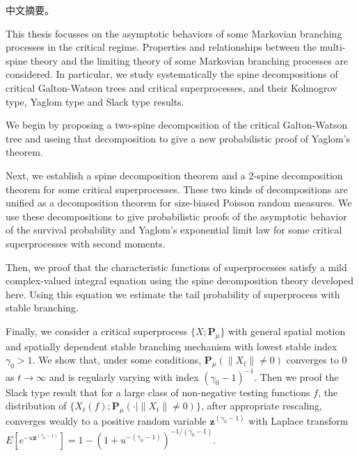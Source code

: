 
\begin{cabstract}
	中文摘要。
\end{cabstract}

\begin{eabstract}
	This thesis focusses on the asymptotic behaviors of some Markovian branching processes in the critical regime.
	Properties and relationships between the multi-spine theory and the limiting theory of some Markovian branching processes are considered.
	In particular, we study systematically the spine decompositions of critical Galton-Watson trees and critical superprocesses, and their Kolmogrov type, Yaglom type and Slack type results. 

	We begin by proposing a two-spine decomposition of the critical Galton-Watson tree and useing that decomposition to give a new probabilistic proof of Yaglom’s theorem.
	
	Next, we establish a spine decomposition theorem and a 2-spine decomposition theorem for some critical superprocesses. These two kinds of decompositions are unified as a decomposition theorem for size-biased Poisson random measures. We use these decompositions to give probabilistic proofs of the asymptotic behavior of the survival probability and Yaglom’s exponential limit law for some critical superprocesses with second moments.

	Then, we proof that the characteristic functions of superprocesses satisfy a mild complex-valued integral equation using the spine decomposition theory developed here. Using this equation we estimate the tail probability of superprocess with stable branching.

	Finally, we consider a critical superprocess $\{X;\mathbf P_\mu\}$ with general spatial motion and spatially dependent stable branching mechanism with lowest stable index $\gamma_0 > 1$. We show that, under some conditions, $\mathbf P_{\mu}(\|X_t\|\neq 0)$ converges to $0$ as $t\to \infty$ and is regularly varying with index $(\gamma_0-1)^{-1}$. Then we proof the Slack type result that for a large class of non-negative testing functions $f$, the distribution of $\{X_t(f);\mathbf P_\mu(\cdot|\|X_t\|\neq 0)\}$, after appropriate rescaling, converges weakly to a positive random variable $\mathbf z^{(\gamma_0-1)}$ with Laplace transform $E[e^{-u\mathbf z^{(\gamma_0-1)}}]=1-(1+u^{-(\gamma_0-1)})^{-1/(\gamma_0-1)}.$
\end{eabstract}

